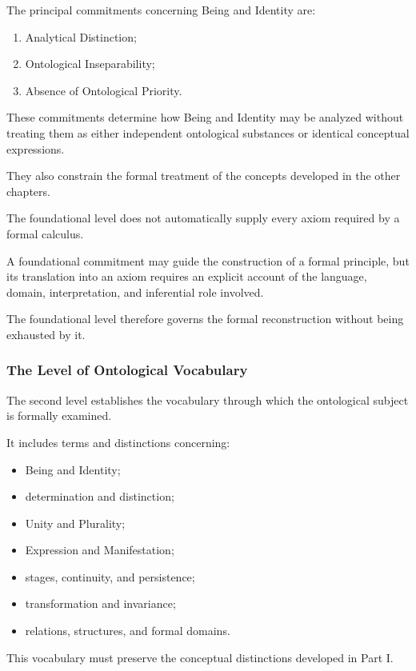 The principal commitments concerning Being
and Identity are:

\begin{enumerate}
    \item Analytical Distinction;
    \item Ontological Inseparability;
    \item Absence of Ontological Priority.
\end{enumerate}

These commitments determine how Being and Identity
may be analyzed without treating them as either
independent ontological substances or identical
conceptual expressions.

They also constrain the formal treatment of
the concepts developed in the other chapters.

The foundational level does not automatically
supply every axiom required by a formal calculus.

A foundational commitment may guide the construction
of a formal principle, but its translation into
an axiom requires an explicit account of the
language, domain, interpretation, and inferential
role involved.

The foundational level therefore governs
the formal reconstruction without being
exhausted by it.

\subsubsection{The Level of Ontological Vocabulary}

The second level establishes the vocabulary
through which the ontological subject is
formally examined.

It includes terms and distinctions concerning:

\begin{itemize}
    \item Being and Identity;
    \item determination and distinction;
    \item Unity and Plurality;
    \item Expression and Manifestation;
    \item stages, continuity, and persistence;
    \item transformation and invariance;
    \item relations, structures, and formal domains.
\end{itemize}

This vocabulary must preserve the conceptual
distinctions developed in Part I.

